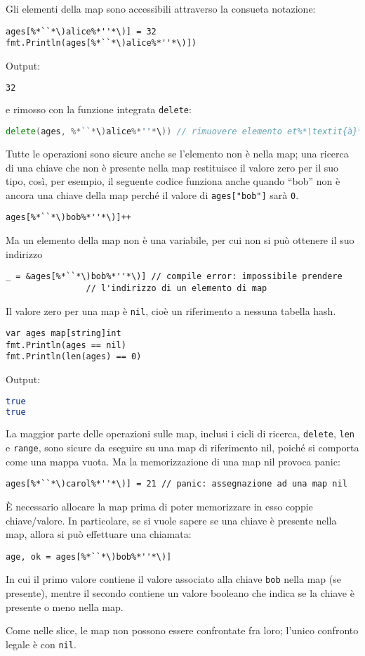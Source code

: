 Gli elementi della map sono accessibili attraverso la consueta notazione:
\begin{lstlisting}[frame=single, label={lst:lstlisting3-3.4}]
ages[%*``*\)alice%*''*\)] = 32
fmt.Println(ages[%*``*\)alice%*''*\)])
\end{lstlisting}
Output:
\begin{lstlisting}[language=bash, frame=L, label={lst:lstlisting3-3.5}]
32
\end{lstlisting}
e rimosso con la funzione integrata \verb|delete|:
\begin{lstlisting}[language=go, frame=single, label={lst:lstlisting3-3.6}]
delete(ages, %*``*\)alice%*''*\)) // rimuovere elemento et%*\textit{à}*\)[%*``*\)alice%*''*\)]
\end{lstlisting}
Tutte le operazioni sono sicure anche se l'elemento non è nella map;
una ricerca di una chiave che non è presente nella map restituisce il valore zero per il suo tipo, così, per esempio, il seguente codice funziona anche quando ``bob'' non è ancora una chiave della map perché il valore di \verb|ages["bob"]| sarà \verb|0|.
\begin{lstlisting}[frame=single, label={lst:lstlisting3-3.7}]
ages[%*``*\)bob%*''*\)]++
\end{lstlisting}
Ma un elemento della map non è una variabile, per cui non si può ottenere il suo indirizzo
\begin{lstlisting}[frame=single, label={lst:lstlisting3-3.8}]
_ = &ages[%*``*\)bob%*''*\)] // compile error: impossibile prendere
                // l'indirizzo di un elemento di map
\end{lstlisting}
Il valore zero per una map è \verb|nil|, cioè un riferimento a nessuna tabella hash.
\begin{lstlisting}[frame=single, label={lst:lstlisting3-3.9}]
var ages map[string]int
fmt.Println(ages == nil)
fmt.Println(len(ages) == 0)
\end{lstlisting}
Output:
\begin{lstlisting}[language=bash, frame=L, label={lst:lstlisting3-3.10}]
true
true
\end{lstlisting}
La maggior parte delle operazioni sulle map, inclusi i cicli di ricerca, \verb|delete|, \verb|len| e \verb|range|, sono sicure da eseguire su una map di riferimento nil, poiché si comporta come una mappa vuota.
Ma la memorizzazione di una map nil provoca panic:
\begin{lstlisting}[frame=single, label={lst:lstlisting3-3.11}]
ages[%*``*\)carol%*''*\)] = 21 // panic: assegnazione ad una map nil
\end{lstlisting}
È necessario allocare la map prima di poter memorizzare in esso coppie chiave/valore.
In particolare, se si vuole sapere se una chiave è presente nella map, allora si può effettuare una chiamata:
\begin{lstlisting}[frame=single, label={lst:lstlisting3-3.12}]
age, ok = ages[%*``*\)bob%*''*\)]
\end{lstlisting}
In cui il primo valore contiene il valore associato alla chiave \verb|bob| nella map (se presente), mentre il secondo contiene un valore booleano che indica se la chiave è presente o meno nella map.

Come nelle slice, le map non possono essere confrontate fra loro;
l'unico confronto legale è con \verb|nil|.